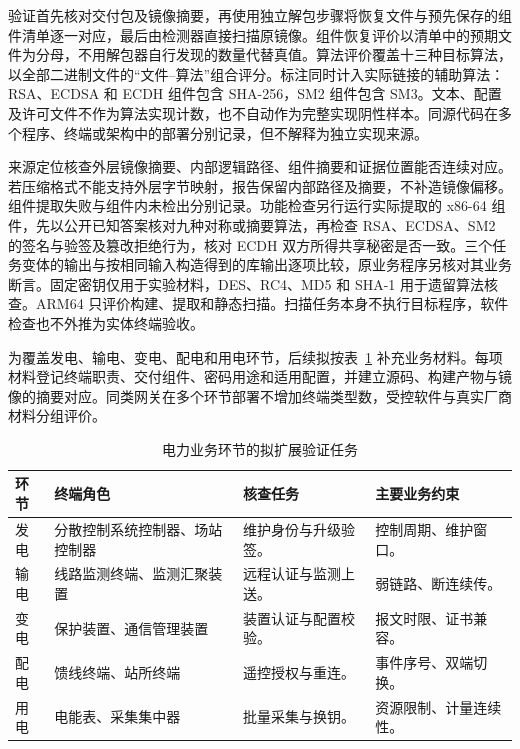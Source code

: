 验证首先核对交付包及镜像摘要，再使用独立解包步骤将恢复文件与预先保存的组件清单逐一对应，最后由检测器直接扫描原镜像。组件恢复评价以清单中的预期文件为分母，不用解包器自行发现的数量代替真值。算法评价覆盖十三种目标算法，以全部二进制文件的“文件--算法”组合评分。标注同时计入实际链接的辅助算法：RSA、ECDSA 和 ECDH 组件包含 SHA-256，SM2 组件包含 SM3。文本、配置及许可文件不作为算法实现计数，也不自动作为完整实现阴性样本。同源代码在多个程序、终端或架构中的部署分别记录，但不解释为独立实现来源。

来源定位核查外层镜像摘要、内部逻辑路径、组件摘要和证据位置能否连续对应。若压缩格式不能支持外层字节映射，报告保留内部路径及摘要，不补造镜像偏移。组件提取失败与组件内未检出分别记录。功能检查另行运行实际提取的 x86-64 组件，先以公开已知答案核对九种对称或摘要算法，再检查 RSA、ECDSA、SM2 的签名与验签及篡改拒绝行为，核对 ECDH 双方所得共享秘密是否一致。三个任务变体的输出与按相同输入构造得到的库输出逐项比较，原业务程序另核对其业务断言。固定密钥仅用于实验材料，DES、RC4、MD5 和 SHA-1 用于遗留算法核查。ARM64 只评价构建、提取和静态扫描。扫描任务本身不执行目标程序，软件检查也不外推为实体终端验收。
 
为覆盖发电、输电、变电、配电和用电环节，后续拟按表~\ref{tab:full-chain-power-design} 补充业务材料。每项材料登记终端职责、交付组件、密码用途和适用配置，并建立源码、构建产物与镜像的摘要对应。同类网关在多个环节部署不增加终端类型数，受控软件与真实厂商材料分组评价。

\begin{table}[htbp]\centering\small
  \caption{电力业务环节的拟扩展验证任务}
  \label{tab:full-chain-power-design}
  \begin{tabularx}{\linewidth}{@{}p{0.8cm}>{\raggedright\arraybackslash}p{2.9cm}>{\raggedright\arraybackslash}X>{\raggedright\arraybackslash}p{3.0cm}@{}}\toprule
  环节 & 终端角色 & 核查任务 & 主要业务约束\\\midrule
  发电 & 分散控制系统控制器、场站控制器 & 维护身份与升级验签。 & 控制周期、维护窗口。\\
  输电 & 线路监测终端、监测汇聚装置 & 远程认证与监测上送。 & 弱链路、断连续传。\\
  变电 & 保护装置、通信管理装置 & 装置认证与配置校验。 & 报文时限、证书兼容。\\
  配电 & 馈线终端、站所终端 & 遥控授权与重连。 & 事件序号、双端切换。\\
  用电 & 电能表、采集集中器 & 批量采集与换钥。 & 资源限制、计量连续性。\\\bottomrule
  \end{tabularx}
\end{table}

